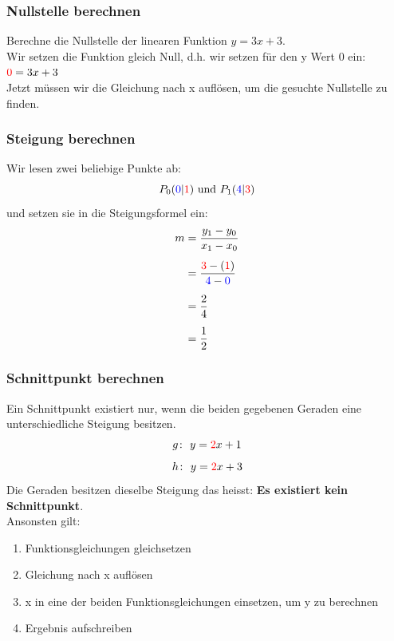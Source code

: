\begin{multicols}{2}
    \subsubsection{Nullstelle berechnen}
    \vspace{-4mm}

    Berechne die Nullstelle der linearen Funktion  $y = 3x + 3$. \\
    Wir setzen die Funktion gleich Null, d.h. wir setzen für den y Wert 0 ein: ${\color{red}{0}} = 3x + 3$ \\
    Jetzt müssen wir die Gleichung nach x auflösen, um die gesuchte Nullstelle zu finden.
    \subsubsection{Steigung berechnen}
    Wir lesen zwei beliebige Punkte ab:
    \[P_0({\color{blue}0}|{\color{red}1}) \text{ und } P_1({\color{blue}4}|{\color{red}3})\]
    und setzen sie in die Steigungsformel ein:
    \begin{align*} m &= \frac{y_1 - y_0}{x_1 - x_0} \\[5px] &= \frac{{\color{red}3} - ({\color{red}1})}{{\color{blue}4} - {\color{blue}0}}\\[5px] &= \frac{2}{4} \\[5px] &= \frac{1}{2} \end{align*}
    \subsubsection{Schnittpunkt berechnen}
    \vspace{-4mm}

    Ein Schnittpunkt existiert nur, wenn die beiden gegebenen Geraden eine unterschiedliche Steigung besitzen.
    \[g\colon~y = {\color{red}2}x + 1\]
    \[h\colon~y = {\color{red}2}x + 3\]
    Die Geraden besitzen dieselbe Steigung das heisst: \textbf{Es existiert kein Schnittpunkt}.\\
    Ansonsten gilt:
    \begin{enumerate}
        \item Funktionsgleichungen gleichsetzen
        \item Gleichung nach x auflösen
        \item x in eine der beiden Funktionsgleichungen einsetzen, um y zu berechnen
        \item Ergebnis aufschreiben
    \end{enumerate}


\end{multicols}
